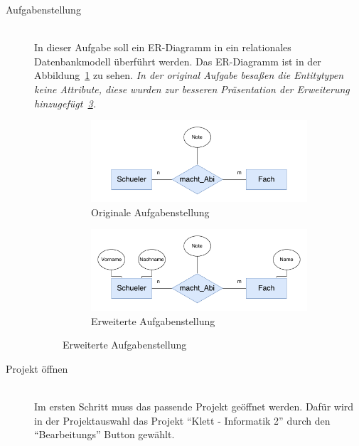\begin{description}
\item[Aufgabenstellung] \hfill\\
In dieser Aufgabe soll ein ER-Diagramm in ein relationales Datenbankmodell überführt werden. Das ER-Diagramm ist in der Abbildung~\ref{pic:exercise} zu sehen. \textit{In der original Aufgabe besaßen die Entitytypen keine Attribute, diese wurden zur besseren Präsentation der Erweiterung hinzugefügt~\ref{pic:exercise_extended}.}

\begin{figure}[h]
  \begin{subfigure}[b]{0.45\textwidth}
    \includegraphics[width=\textwidth]{images/aufg_norm.pdf}
    \caption{Originale Aufgabenstellung}
    \label{pic:exercise}
  \end{subfigure}\hfill
  \begin{subfigure}[b]{0.45\textwidth}
    \includegraphics[width=\textwidth]{images/aufg_extra.pdf}
    \caption{Erweiterte Aufgabenstellung}
    \label{pic:exercise_extended}
  \end{subfigure}
\end{figure}

\item[Projekt öffnen] \hfill\\
Im ersten Schritt muss das passende Projekt geöffnet werden. Dafür wird in der Projektauswahl das Projekt ``Klett - Informatik 2'' durch den ``Bearbeitungs'' Button gewählt.


\end{description}
